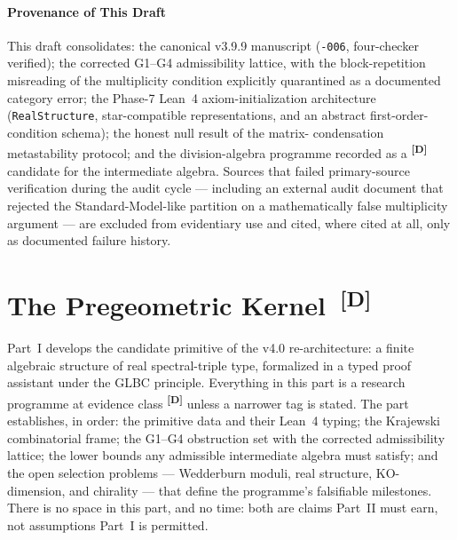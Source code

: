 \documentclass[12pt,a4paper,twoside]{article}
\theoremstyle{plain}
\theoremstyle{definition}
\theoremstyle{remark}
\newcommand{\catmark}[1]{\textsuperscript{\textsf{\textbf{[#1]}}}}
\begin{document}
\subsection{Provenance of This Draft}
\label{subsec:provenance}

This draft consolidates: the canonical v3.9.9 manuscript
(\texttt{-006}, four-checker verified); the corrected G1--G4
admissibility lattice, with the block-repetition misreading of the
multiplicity condition explicitly quarantined as a documented category
error; the Phase-7 Lean~4 axiom-initialization architecture
(\texttt{RealStructure}, star-compatible representations, and an abstract
first-order-condition schema); the honest null result of the matrix-%
condensation metastability protocol; and the division-algebra programme
recorded as a \catmark{D} candidate for the intermediate algebra. Sources
that failed primary-source verification during the audit cycle ---
including an external audit document that rejected the
Standard-Model-like partition on a mathematically false multiplicity
argument --- are excluded from evidentiary use and cited, where cited at
all, only as documented failure history.

\newpage
\part{The Pregeometric Kernel\texorpdfstring{\ \catmark{D}}{[D]}}
\label{part:pregeometric-kernel}

\noindent Part~I develops the candidate primitive of the v4.0
re-architecture: a finite algebraic structure of real spectral-triple type,
formalized in a typed proof assistant under the GLBC principle. Everything
in this part is a research programme at evidence class \catmark{D} unless
a narrower tag is stated. The part establishes, in order: the primitive
data and their Lean~4 typing; the Krajewski combinatorial frame; the
G1--G4 obstruction set with the corrected admissibility lattice; the lower
bounds any admissible intermediate algebra must satisfy; and the open
selection problems --- Wedderburn moduli, real structure, KO-dimension,
and chirality --- that define the programme's falsifiable milestones.
There is no space in this part, and no time: both are claims Part~II must
earn, not assumptions Part~I is permitted.

\end{document}

